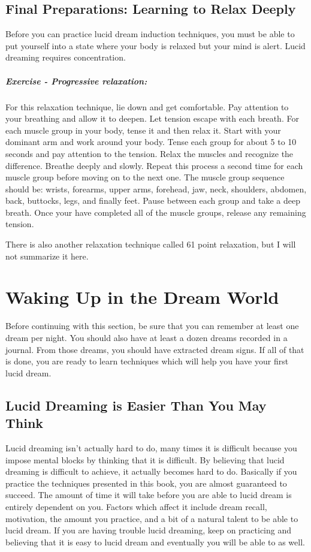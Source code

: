 \documentclass{report}
\begin{document}
\section{Final Preparations: Learning to Relax Deeply}
Before you can practice lucid dream induction techniques, you must be able to put yourself into a state where your body is relaxed but your mind is alert. Lucid dreaming requires concentration.

\paragraph{Exercise - Progressive relaxation:} For this relaxation technique, lie down and get comfortable. Pay attention to your breathing and allow it to deepen. Let tension escape with each breath. For each muscle group in your body, tense it and then relax it. Start with your dominant arm and work around your body. Tense each group for about 5 to 10 seconds and pay attention to the tension. Relax the muscles and recognize the difference. Breathe deeply and slowly. Repeat this process a second time for each muscle group before moving on to the next one. The muscle group sequence should be: wrists, forearms, upper arms, forehead, jaw, neck, shoulders, abdomen, back, buttocks, legs, and finally feet. Pause between each group and take a deep breath. Once your have completed all of the muscle groups, release any remaining tension.

\bigskip\noindent There is also another relaxation technique called 61 point relaxation, but I will not summarize it here.



\chapter{Waking Up in the Dream World}
Before continuing with this section, be sure that you can remember at least one dream per night. You should also have at least a dozen dreams recorded in a journal. From those dreams, you should have extracted dream signs. If all of that is done, you are ready to learn techniques which will help you have your first lucid dream.

\section{Lucid Dreaming is Easier Than You May Think}
Lucid dreaming isn't actually hard to do, many times it is difficult because you impose mental blocks by thinking that it is difficult. By believing that lucid dreaming is difficult to achieve, it actually becomes hard to do. Basically if you practice the techniques presented in this book, you are almost guaranteed to succeed. The amount of time it will take before you are able to lucid dream is entirely dependent on you. Factors which affect it include dream recall, motivation, the amount you practice, and a bit of a natural talent to be able to lucid dream. If you are having trouble lucid dreaming, keep on practicing and believing that it is easy to lucid dream and eventually you will be able to as well.
\end{document}
